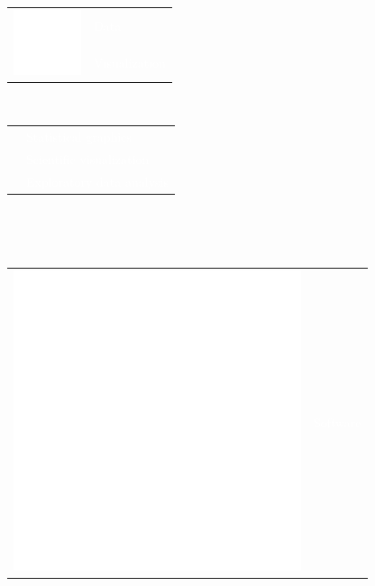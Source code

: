 \documentclass[letterpaper]{article}
\begin{document}
\begin{minipage}[t]{1.\linewidth}
\begin{minipage}{0.47\linewidth}
{\begin{minipage}{1\linewidth}
\begin{minipage}{1\linewidth}
\begin{minipage}[t]{0.47\linewidth}
\begin{minipage}{1\linewidth}
{				} 
			\end{minipage}	
		\end{minipage}
		\hfill
		\begin{minipage}[t]{0.47\linewidth}
			\begin{tabularx}{1\textwidth}{rX}
				\multirow{2}{*}{\includegraphics[width=0.18\linewidth]{visualize.eps}}
				 & \large\textmd{\textcolor{white}{Data}}\\
				 & \large\textmd{\textcolor{white}{Visualization}}\\
			\end{tabularx}\\
			\begin{minipage}{1\linewidth}
				\vspace{1ex}
				{\small
				\begin{tabularx}{1\textwidth}{rX}
					& \textcolor{white}{Statistical graphics}\\
				 	& \textcolor{white}{Scientific visualization}\\
				 	& \textcolor{white}{Exploratory data 
				 	analysis}\\				 	
				\end{tabularx}\\
				}
			\end{minipage}			
		\vspace{1ex}
		\end{minipage}		
	\end{minipage}\\
	\begin{minipage}{1\linewidth} %
		\vspace{2ex}
		\begin{minipage}[t]{0.47\linewidth}
			\begin{minipage}{1\linewidth}
				\begin{tabularx}{1\textwidth}{rX}
					\multirow{2}{*}{\includegraphics[width=0.18\linewidth]{arrows.eps}}
					& \large\textmd{\textcolor{white}{Software}}\\

\end{tabularx}
\end{minipage}
\end{minipage}
\end{minipage}
\end{minipage}}
\end{minipage}
\end{minipage}
\end{document}
